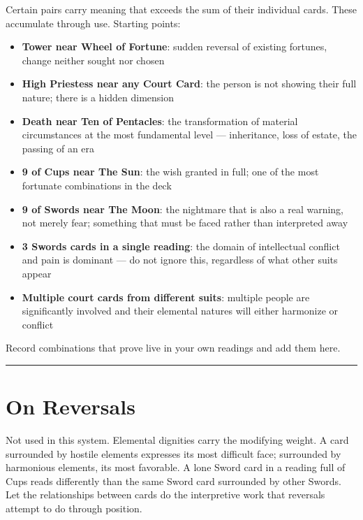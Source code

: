 Certain pairs carry meaning that exceeds the sum of their individual cards. These accumulate through use. Starting points:

\begin{itemize}
\tightlist
\item
  \textbf{Tower near Wheel of Fortune}: sudden reversal of existing fortunes, change neither sought nor chosen
\item
  \textbf{High Priestess near any Court Card}: the person is not showing their full nature; there is a hidden dimension
\item
  \textbf{Death near Ten of Pentacles}: the transformation of material circumstances at the most fundamental level --- inheritance, loss of estate, the passing of an era
\item
  \textbf{9 of Cups near The Sun}: the wish granted in full; one of the most fortunate combinations in the deck
\item
  \textbf{9 of Swords near The Moon}: the nightmare that is also a real warning, not merely fear; something that must be faced rather than interpreted away
\item
  \textbf{3 Swords cards in a single reading}: the domain of intellectual conflict and pain is dominant --- do not ignore this, regardless of what other suits appear
\item
  \textbf{Multiple court cards from different suits}: multiple people are significantly involved and their elemental natures will either harmonize or conflict
\end{itemize}

Record combinations that prove live in your own readings and add them here.

\begin{center}\rule{0.5\linewidth}{0.5pt}\end{center}

\section{On Reversals}\label{on-reversals}

Not used in this system. Elemental dignities carry the modifying weight. A card surrounded by hostile elements expresses its most difficult face; surrounded by harmonious elements, its most favorable. A lone Sword card in a reading full of Cups reads differently than the same Sword card surrounded by other Swords. Let the relationships between cards do the interpretive work that reversals attempt to do through position.
